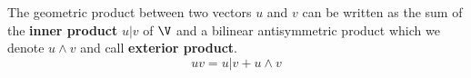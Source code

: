 \begin{theorem}\label{t:geometric-product}
	The geometric product between two vectors $u$ and $v$ can be written as the sum of the \textbf{inner product} $u|v$ of $\V$ and a bilinear antisymmetric product which we denote $u\wedge v$ and call \textbf{exterior product}.
\[uv = u|v + u\wedge v\] 
\end{theorem}
